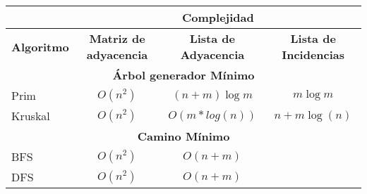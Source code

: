 \begin{center}
  \begin{tabular}{|l|c|c|c|}
    \hline
                       & \multicolumn{3}{c|}{\textbf{Complejidad}}                                                                \\
    \hline
    \textbf{Algoritmo} & \textbf{Matriz de adyacencia}             & \textbf{Lista de Adyacencia} & \textbf{Lista de Incidencias} \\
    \hline
    \multicolumn{4}{|c|}{\cellcolor{blue!25}\textbf{Árbol generador Mínimo}}                                                      \\
    \hline
    Prim               & \(O(n^2)\)                                & \((n + m)\log{m}\)           & \(m\log{m}\)                  \\
    \hline
    Kruskal            & \(O(n^2)\)                                & \(O(m*log(n))\)              & \(n + m\log{(n)}\)            \\
    \hline
    \multicolumn{4}{|c|}{\cellcolor{blue!25}\textbf{Camino Mínimo}}                                                               \\
    \hline
    BFS                & \(O(n^2)\)                                & \(O(n + m)\)                 &                               \\
    \hline
    DFS                & \(O(n^2)\)                                & \(O(n + m)\)                 &                               \\
    \hline
  \end{tabular}
\end{center}